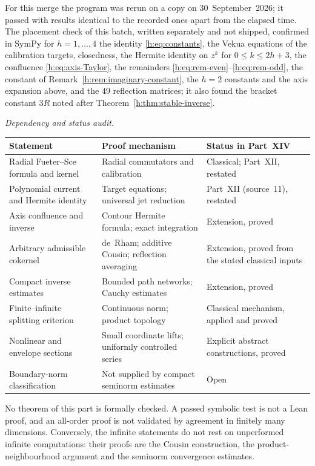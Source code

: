 \documentclass[11pt,a4paper]{article}
\numberwithin{equation}{section}
\theoremstyle{definition}
\theoremstyle{remark}
\theoremstyle{plain}
\begin{document}
For this merge the program was rerun on a copy on 30~September~2026; it passed
with results identical to the recorded ones apart from the elapsed time. The
placement check of this batch, written separately and not shipped, confirmed
in SymPy for $h=1,\dots,4$ the identity \eqref{h:eq:constants}, the Vekua
equations of the calibration targets, closedness, the Hermite identity on
$z^k$ for $0\le k\le2h+3$, the confluence \eqref{h:eq:axis-Taylor}, the
remainders \eqref{h:eq:rem-even}--\eqref{h:eq:rem-odd}, the constant of
Remark~\ref{h:rem:imaginary-constant}, the $h=2$ constants and the axis
expansion above, and the $49$ reflection matrices; it also found the bracket
constant $3R$ noted after Theorem~\ref{h:thm:stable-inverse}.

\emph{Dependency and status audit.}

\begin{center}
\small
\begin{tabular}{@{}>{\raggedright\arraybackslash}p{}
 >{\raggedright\arraybackslash}p{}
 >{\raggedright\arraybackslash}p{}@{}}
\toprule
Statement & Proof mechanism & Status in Part~XIV\\
\midrule
Radial Fueter--Sce formula and kernel & Radial commutators and calibration &
 Classical; Part~XII, restated\\
Polynomial current and Hermite identity & Target equations; universal jet
 reduction & Part~XII (source~11), restated\\
Axis confluence and inverse & Contour Hermite formula; exact integration &
 Extension, proved\\
Arbitrary admissible cokernel & de~Rham; additive Cousin; reflection averaging
 & Extension, proved from the stated classical inputs\\
Compact inverse estimates & Bounded path networks; Cauchy estimates &
 Extension, proved\\
Finite--infinite splitting criterion & Continuous norm; product topology &
 Classical mechanism, applied and proved\\
Nonlinear and envelope sections & Small coordinate lifts; uniformly
 controlled series & Explicit abstract constructions, proved\\
Boundary-norm classification & Not supplied by compact seminorm estimates &
 Open\\
\bottomrule
\end{tabular}
\end{center}

No theorem of this part is formally checked. A passed symbolic test is not a
Lean proof, and an all-order proof is not validated by agreement in finitely
many dimensions. Conversely, the infinite statements do not rest on unperformed
infinite computations: their proofs are the Cousin construction, the
product-neighbourhood argument and the seminorm convergence estimates.
\end{document}
